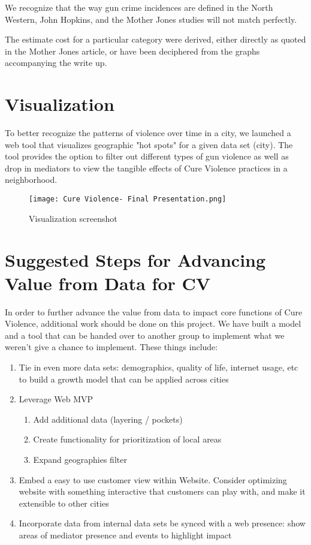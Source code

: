 \documentclass[11pt,preprint]{aastex}
\begin{document}
We recognize that the way gun crime incidences are defined in the North Western, John Hopkins, and the Mother Jones studies will not match perfectly.


The estimate cost for a particular category were derived, either directly as quoted in the Mother Jones article, or have been deciphered from the graphs accompanying the write up. 

\section{Visualization}
To better recognize the patterns of violence over time in a city, we launched a web tool that visualizes geographic "hot spots" for a given data set (city).  The tool provides the option to filter out different types of gun violence as well as drop in mediators to view the tangible effects of Cure Violence practices in a neighborhood.

\begin{figure}[h]
\centering
\texttt{[image: Cure Violence- Final Presentation.png]}
\caption{Visualization screenshot}
\end{figure}

\newpage
\section{Suggested Steps  for Advancing Value from Data for CV}
In order to further advance the value from data to impact core functions of Cure Violence, additional work should be done on this project.  We have built a model and a tool that can be handed over to another group to implement what we weren't give a chance to implement.  These things include:
\begin{enumerate}
    \item Tie in even more data sets: demographics, quality of life, internet usage, etc to build a growth model that can be applied across cities
    \item Leverage Web MVP
    \begin{enumerate}
        \item Add additional data (layering / pockets)
        \item Create functionality for prioritization of local areas
        \item Expand geographies filter
    \end{enumerate}
    \item Embed a easy to use customer view within Website.  Consider optimizing website with something interactive that customers can play with, and make it extensible to other cities
    \item Incorporate data from internal data sets be synced with a web presence: show areas of mediator presence and events to highlight impact

\end{enumerate}
\end{document}

